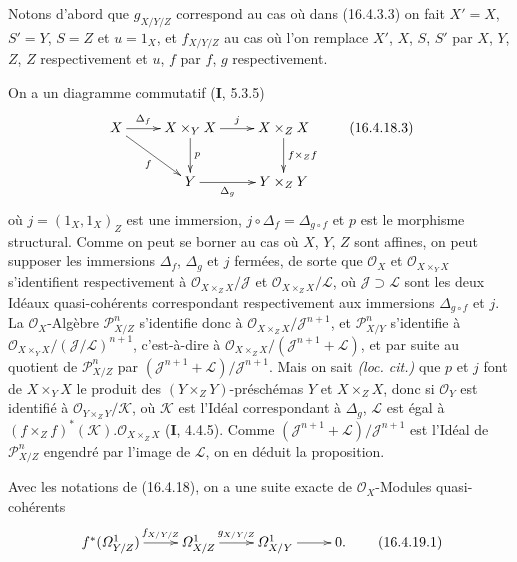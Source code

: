 Notons d'abord que $g_{X/Y/Z}$ correspond au cas où dans (16.4.3.3) on fait
$X'=X$, $S'=Y$, $S=Z$ et $u=1_X$, et $f_{X/Y/Z}$ au cas où l'on remplace
$X'$, $X$, $S$, $S'$ par $X$, $Y$, $Z$, $Z$ respectivement et $u$, $f$ par
$f$, $g$ respectivement.

On a un diagramme commutatif (\textbf{I}, 5.3.5)
\[
  \xymatrix{
    X\ar[r]^-{\Delta_f}\ar[dr]_-f
      &X\times_Y X\ar[d]^-p\ar[r]^-j
      &X\times_Z X\ar[d]^-{f\times_Z f}\\
    &Y\ar[r]_-{\Delta_g}&Y\times_Z Y
  }
  \tag{16.4.18.3}
  \label{IV.16.4.18.3}
\]
où $j=(1_X,1_X)_Z$ est une immersion, $j\circ\Delta_f=\Delta_{g\circ f}$ et
$p$ est le morphisme structural. Comme on peut se borner au cas où $X$, $Y$,
$Z$ sont affines, on peut supposer les immersions $\Delta_f$, $\Delta_g$ et
$j$ fermées, de sorte que $\mathcal{O}_X$ et
$\mathcal{O}_{X\times_Y X}$ s'identifient respectivement à
$\mathcal{O}_{X\times_Z X}/\mathscr{J}$ et
$\mathcal{O}_{X\times_Z X}/\mathscr{L}$, où
$\mathscr{J}\supset\mathscr{L}$ sont les deux Idéaux quasi-cohérents
correspondant respectivement aux immersions $\Delta_{g\circ f}$ et $j$. La
$\mathcal{O}_X$-Algèbre $\mathscr{P}_{X/Z}^n$ s'identifie donc à
$\mathcal{O}_{X\times_Z X}/\mathscr{J}^{n+1}$, et
$\mathscr{P}_{X/Y}^n$ s'identifie à
$\mathcal{O}_{X\times_Y X}/(\mathscr{J}/\mathscr{L})^{n+1}$, c'est-à-dire à
$\mathcal{O}_{X\times_Z X}/(\mathscr{J}^{n+1}+\mathscr{L})$, et par suite au
quotient de $\mathscr{P}_{X/Z}^n$ par
$(\mathscr{J}^{n+1}+\mathscr{L})/\mathscr{J}^{n+1}$. Mais on sait
\emph{(loc. cit.)} que $p$ et $j$ font de $X\times_Y X$ le produit des
$(Y\times_Z Y)$-préschémas $Y$ et $X\times_Z X$, donc si $\mathcal{O}_Y$ est
identifié à $\mathcal{O}_{Y\times_Z Y}/\mathscr{K}$, où $\mathscr{K}$ est
l'Idéal correspondant à $\Delta_g$, $\mathscr{L}$ est égal à
$(f\times_Z f)^*(\mathscr{K}).\mathcal{O}_{X\times_Z X}$ (\textbf{I}, 4.4.5).
Comme $(\mathscr{J}^{n+1}+\mathscr{L})/\mathscr{J}^{n+1}$ est l'Idéal de
$\mathscr{P}_{X/Z}^n$ engendré par l'image de $\mathscr{L}$, on en déduit la
proposition.

\begin{corollary}[16.4.19]
\label{IV.16.4.19}
Avec les notations de \textup{(16.4.18)}, on a une suite exacte de
$\mathcal{O}_X$-Modules quasi-cohérents
\[
  \xymatrix{
    f^*(\varOmega_{Y/Z}^1)\ar[r]^-{f_{X/Y/Z}}&
    \varOmega_{X/Z}^1\ar[r]^-{g_{X/Y/Z}}&
    \varOmega_{X/Y}^1\ar[r]&0.
  }
  \tag{16.4.19.1}
  \label{IV.16.4.19.1}
\]
\end{corollary}

